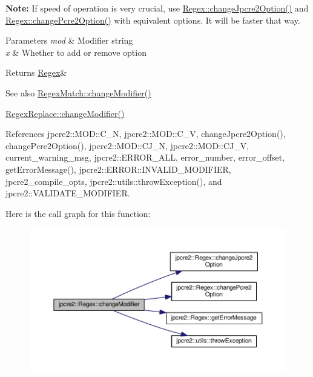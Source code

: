 {\bfseries Note\+:} If speed of operation is very crucial, use \hyperlink{classjpcre2_1_1Regex_ab8e0b1a49eeb1077ba54cf3b5292c95e}{Regex\+::change\+Jpcre2\+Option()} and \hyperlink{classjpcre2_1_1Regex_ae5bde8008cc5a700163ca3162dbd5823}{Regex\+::change\+Pcre2\+Option()} with equivalent options. It will be faster that way. 
\begin{DoxyParams}{Parameters}
{\em mod} & Modifier string \\
\hline
{\em x} & Whether to add or remove option \\
\hline
\end{DoxyParams}
\begin{DoxyReturn}{Returns}
\hyperlink{classjpcre2_1_1Regex}{Regex}\& 
\end{DoxyReturn}
\begin{DoxySeeAlso}{See also}
\hyperlink{classjpcre2_1_1RegexMatch_a1265862f04984dfde8d36e2ff409b0c9}{Regex\+Match\+::change\+Modifier()} 

\hyperlink{classjpcre2_1_1RegexReplace_ae58d2a44ed474568554202612d45c814}{Regex\+Replace\+::change\+Modifier()} 
\end{DoxySeeAlso}


References jpcre2\+::\+M\+O\+D\+::\+C\+\_\+N, jpcre2\+::\+M\+O\+D\+::\+C\+\_\+V, change\+Jpcre2\+Option(), change\+Pcre2\+Option(), jpcre2\+::\+M\+O\+D\+::\+C\+J\+\_\+N, jpcre2\+::\+M\+O\+D\+::\+C\+J\+\_\+V, current\+\_\+warning\+\_\+msg, jpcre2\+::\+E\+R\+R\+O\+R\+\_\+\+A\+LL, error\+\_\+number, error\+\_\+offset, get\+Error\+Message(), jpcre2\+::\+E\+R\+R\+O\+R\+::\+I\+N\+V\+A\+L\+I\+D\+\_\+\+M\+O\+D\+I\+F\+I\+ER, jpcre2\+\_\+compile\+\_\+opts, jpcre2\+::utils\+::throw\+Exception(), and jpcre2\+::\+V\+A\+L\+I\+D\+A\+T\+E\+\_\+\+M\+O\+D\+I\+F\+I\+ER.



Here is the call graph for this function\+:\nopagebreak
\begin{figure}[H]
\begin{center}
\leavevmode
\includegraphics[width=350pt]{classjpcre2_1_1Regex_abc4a13f1baa8f23a8747fb0ffd46a836_cgraph}
\end{center}
\end{figure}


